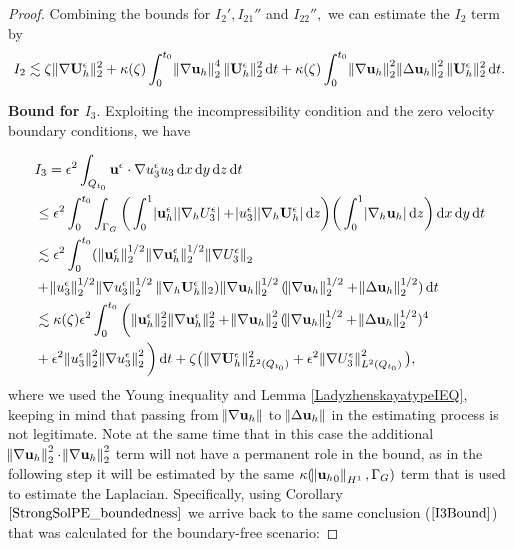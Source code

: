 \documentclass[11pt, a4paper]{article}
\newcommand*\diff{\mathop{}\!\mathrm{d}}
\begin{document}
\begin{proof}
Combining the bounds for $I_2', I_{21}''$ and $I_{22}'',$ we can estimate the $I_2$ term by
$$ I_2 \lesssim \zeta \| \nabla \mathbf{U}_h^\epsilon \| ^2_2 + \kappa(\zeta) \int_0^{t_0} \norm{\nabla \mathbf{u}_h}_2^4 \| \mathbf{U}_h^\epsilon \| _2^2 \diff t + \kappa(\zeta) \int_0^{t_0} \norm{\nabla \mathbf{u}_h}_2^2 \norm{\Delta \mathbf{u}_h}_2^2 \| \mathbf{U}_h^\epsilon \| _2^2 \diff t. $$

\textbf{Bound for $I_3.$} Exploiting the incompressibility condition and the zero velocity boundary conditions, we have

\begin{equation}
\begin{split}
& I_3 = \epsilon^2 \int_{Q_{t_0}} \mathbf{u}^\epsilon \cdot \nabla u_3^\epsilon u_3 \diff x \diff y \diff z \diff t \\
& \leq \epsilon^2 \int_0^{t_0} \int_{\Gamma_G} \bigg ( \int_0^1 \abs{\mathbf{u}_h^\epsilon} \abs{\nabla_h U_3^\epsilon} + \abs{u_3^\epsilon} \abs{\nabla_h \mathbf{U}_h^\epsilon}\diff z \bigg) \bigg ( \int_0^1 \abs{\nabla_h \mathbf{u}_h} \diff z \bigg ) \diff x \diff y \diff t \\
& \lesssim \epsilon^2 \int_0^{t_0} ( \| \mathbf{u}_h^\epsilon \| _2^{1/2} \| \nabla\mathbf{u}_h^\epsilon \| _2^{1/2} \norm{\nabla U_3^\epsilon}_2 \\
& + \norm{u_3^\epsilon}_2^{1/2} \norm{\nabla u_3^\epsilon}_2^{1/2} \| \nabla_h \mathbf{U}_h^\epsilon \|_2) \norm{\nabla \mathbf{u}_h }_2^{1/2} (\norm{\nabla \mathbf{u}_h}_2^{1/2} + \norm{\Delta \mathbf{u}_h}_2^{1/2}) \diff t \\
& \lesssim \kappa(\zeta) \epsilon^2 \int_0 ^ {t_0} \bigg ( \| \mathbf{u}_h^\epsilon \| _2^2 \| \nabla \mathbf{u}_h^\epsilon \|_2^2 + \norm{\nabla \mathbf{u}_h}_2^2 (\norm{\nabla \mathbf{u}_h}_2^{1/2} + \norm{\Delta \mathbf{u}_h}_2^{1/2})^4 \\
& + \epsilon^2 \norm{u_3^\epsilon}_2^2 \norm{\nabla u_3^\epsilon}_2^2 \bigg ) \diff t + \zeta \big ( \| \nabla \mathbf{U}_h^\epsilon \|_{L^2(Q_{t_0})}^2 + \epsilon^2 \norm{\nabla U_3^\epsilon}_{L^2(Q_{t_0})}^2 \big),
\end{split}
\end{equation}
%
where we used the Young inequality and Lemma \ref{LadyzhenskayatypeIEQ}, keeping in mind that passing from $\norm{\nabla \mathbf{u}_h}$ to $\norm{\Delta \mathbf{u}_h}$ in the estimating process is not legitimate. Note at the same time that in this case the additional $\norm{\nabla \mathbf{u}_h}_2^2 \cdot \norm{\nabla \mathbf{u}_h}_2^2$ term will not have a permanent role in the bound, as in the following step it will be estimated by the same $\kappa (\norm{{\mathbf{u}_h}_0}_{H^1}, \Gamma_G)$ term that is used to estimate the Laplacian. Specifically, using Corollary $\ref{StrongSolPE_boundedness}$ we arrive back to the same conclusion ($\ref{I3Bound}$) that was calculated for the boundary-free scenario:


\end{proof}
\end{document}
